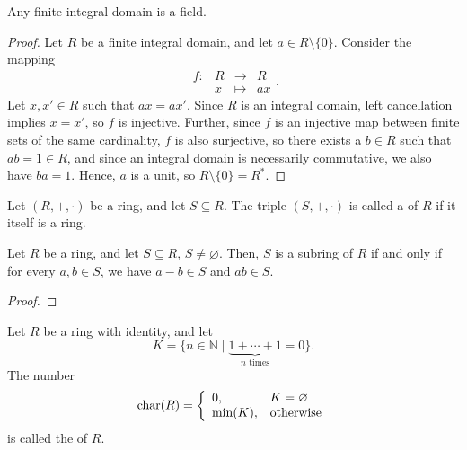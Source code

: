 \begin{thm}
Any finite integral domain is a field.
\end{thm}
\begin{proof}
Let $ R $ be a finite integral domain, and let $ a\in R\setminus\{0\} $. Consider the mapping
\begin{equation*}
    \begin{array}{rccc}
        f: & R & \to & R \\
        & x & \mapsto & ax
    \end{array}.
\end{equation*}
Let $ x,x'\in R $ such that $ ax=ax' $. Since $ R $ is an integral domain, left cancellation implies $ x=x' $, so $ f $ is injective. Further, since $ f $ is an injective map between finite sets of the same cardinality, $ f $ is also surjective, so there exists a $ b\in R $ such that $ ab=1\in R $, and since an integral domain is necessarily commutative, we also have $ ba=1 $. Hence, $ a $ is a unit, so $ R\setminus\{0\}=R^* $.
\end{proof}

\begin{defn}
Let $ (R,+,\cdot) $ be a ring, and let $ S\subseteq R $. The triple $ (S,+,\cdot) $ is called a  of $ R $ if it itself is a ring.
\end{defn}

\begin{thm}
Let $ R $ be a ring, and let $ S\subseteq R $, $ S\neq\varnothing $. Then, $ S $ is a subring of $ R $ if and only if for every $ a,b\in S $, we have $ a-b\in S $ and $ ab\in S $.
\end{thm}
\begin{proof}
\end{proof}

\begin{defn}
Let $ R $ be a ring with identity, and let
\begin{equation*}
    K=\{n\in\mathbb{N}\mid\underbrace{1+\cdots+1}_{n\text{ times}}=0\}.
\end{equation*}
The number
\begin{equation*}
    \operatorname{char}(R)=
    \left\{\begin{array}{ll}
        0, & K=\varnothing \\
        \min(K), & \text{otherwise}
    \end{array}\right.
\end{equation*}
is called the  of $ R $.
\end{defn}

